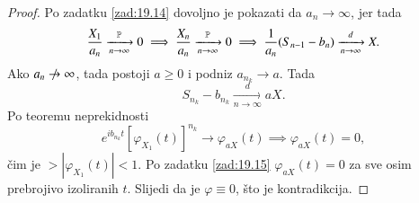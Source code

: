 \begin{proof}
    Po zadatku \ref{zad:19.14} dovoljno je pokazati da $a_n \to \infty$, jer tada
    \begin{equation*}
        \frac{X_1}{a_n} \xrightarrow[n \to \infty]{\mathbb{P}} 0 \implies \frac{X_n}{a_n} \xrightarrow[n \to \infty]{\mathbb{P}} 0 \implies \frac{1}{a_n} (S_{n - 1} - b_n) \xrightarrow[n \to \infty]{d} X.
    \end{equation*}
    Ako $a_n \centernot\to \infty$, tada postoji $a \geq 0$ i podniz $a_{n_k} \to a$.
    Tada
    \begin{equation*}
        S_{n_k} - b_{n_k} \xrightarrow[n \to \infty]{d} a X.
    \end{equation*}
    Po teoremu neprekidnosti
    \begin{equation*}
        e^{i b_{n_k} t} [\varphi_{X_1} (t)]^{n_k} \to \varphi_{a X} (t) \implies \varphi_{a X} (t) = 0,
    \end{equation*}
    \v cim je $>|\varphi_{X_1} (t)| < 1$.
    Po zadatku \ref{zad:19.15} $\varphi_{a X} (t) = 0$ za sve osim prebrojivo izoliranih $t$.
    Slijedi da je $\varphi \equiv 0$, \v sto je kontradikcija.
\end{proof}